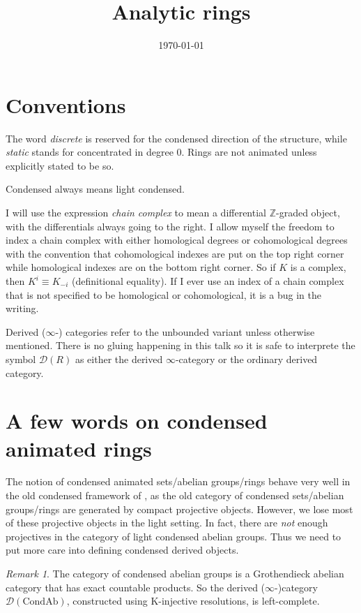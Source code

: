 \documentclass{article}
\title{Analytic rings}
\author{}
\date{\today}
\theoremstyle{plain}
\theoremstyle{definition}
\theoremstyle{remark}
\newtheorem{rmk}[thm]{Remark}
\newcommand{\D}{\mathcal{D}}
\begin{document}
\maketitle

\section*{Conventions}

The word \emph{discrete} is reserved for the condensed direction of the structure, while
\emph{static} stands for concentrated in degree $ 0 $.
Rings are not animated unless explicitly stated to be so.

Condensed always means light condensed.

I will use the expression \emph{chain complex} to mean a differential $ \mathbb{Z} $-graded object, with
the differentials always going to the right.
I allow myself the freedom to index a chain complex with either homological degrees or cohomological degrees with the convention that
cohomological indexes are put on the top right corner while homological indexes are on the bottom right corner.
So if $ K $ is a complex, then $ K ^{i} \equiv K _{-i} $ (definitional equality).
If I ever use an index of a chain complex that is not specified to be homological or cohomological, it is a bug in the writing.

Derived ($ \infty $-) categories refer to the unbounded variant unless otherwise mentioned.
There is no gluing happening in this talk so it is safe to interprete the symbol $ \D(R) $ as either the derived $ \infty $-category
or the ordinary derived category.

\section{A few words on condensed animated rings}

The notion of condensed animated sets/abelian groups/rings behave very well in the old condensed framework of \cite{condensed},
as the old category of condensed sets/abelian groups/rings are generated by compact projective objects.
However, we lose most of these projective objects in the light setting.
In fact, there are \emph{not} enough projectives in the category of light condensed abelian groups.
Thus we need to put more care into defining condensed derived objects.

\begin{rmk}
The category of condensed abelian groups is a Grothendieck abelian category that has exact countable products.
So the derived ($ \infty $-)category $ \D (\mathrm{CondAb}) $,
constructed using K-injective resolutions, is left-complete.
\end{rmk}
\end{document}
